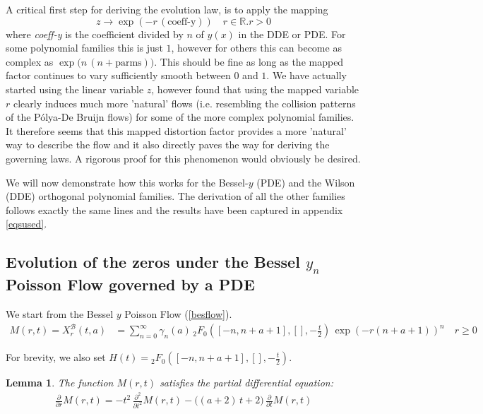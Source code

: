 \documentclass[a4paper,11pt,twoside]{amsart}
\newtheorem{lemma}[theorem]{Lemma}
\newcommand{\verifiedeq}{=}
\newcommand{\defeq}{=}
\newcommand{\verifiedeq}{\stackrel{\checkmark}{=}}
\newcommand{\defeq}{\stackrel{\scriptscriptstyle \textnormal{def}}{=}}
\begin{document}
A critical first step for deriving the evolution law, is to apply the mapping $$z \rightarrow \exp\left(-r\,(\text{coeff-y})\right) \quad r \in \mathbb{R}. r > 0$$ where \textit{coeff-y} is the coefficient divided by $n$ of $y(x)$ in the DDE or PDE. For some polynomial families this is just $1$, however for others this can become as complex as $\exp\big(n\,(n+\text{parms})\big)$. This should be fine as long as the mapped factor continues to vary sufficiently smooth between $0$ and $1$. We have actually started using the linear variable $z$, however found that using the mapped variable $r$ clearly induces much more 'natural' flows (i.e. resembling the collision patterns of the Pólya-De Bruijn flows) for some of the more complex polynomial families. It therefore seems that this mapped distortion factor provides a more 'natural' way to describe the flow and it also directly paves the way for deriving the governing laws. A rigorous proof for this phenomenon would obviously be desired.    

We will now demonstrate how this works for the Bessel-$y$ (PDE) and the Wilson (DDE) orthogonal polynomial families. The derivation of all the other families follows exactly the same lines and the results have been captured in appendix \ref{eqsused}.

\subsection{Evolution of the zeros under the Bessel $y_n$ Poisson Flow governed by a PDE} \label{Bessellawspoissonflow}
We start from the Bessel $y$ Poisson Flow (\ref{besflow}).
\begin{align}
  M(r,t)=X^{\mathcal{B}}_{r}(t,a) &\verifiedeq \sum_{n=0}^\infty \gamma_n(a)\,{}_2F_0\left([-n, n+a+1],[],-\frac{t}{2}\right)\,\exp(-r(n+a+1))^{n} \quad r \ge 0
\end{align} 

For brevity, we also set $H(t) \defeq {}_2F_0\left([-n, n+a+1],[],-\frac{t}{2}\right)$. 

\begin{lemma}\label{proofBes1} The function $M(r,t)$ satisfies the partial differential equation: 
\begin{align}
 \frac{\partial}{\partial r}M(r,t) \verifiedeq -t^2\,\frac{\partial^2}{\partial t^2}M(r,t) - \big((a+2)\,t+2\big)\,\frac{\partial }{\partial t}M(r,t)
\end{align}
\end{lemma}
\end{document}
